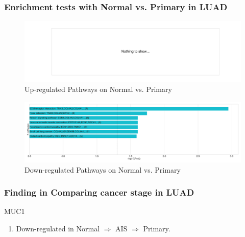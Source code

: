 \documentclass{beamer}
\begin{document}
    \begin{frame}
        \frametitle{Enrichment tests with Normal vs. Primary in LUAD}

        \begin{figure}
            \includegraphics[width=0.8 \linewidth]{figures/DEG/Enrichment/STAR.FPKM.ADC.Normal-Primary.Up.KEGG.pdf}
            \caption{Up-regulated Pathways on Normal vs. Primary}
        \end{figure}

        \begin{figure}
            \includegraphics[width=0.8 \linewidth]{figures/DEG/Enrichment/STAR.FPKM.ADC.Normal-Primary.Down.KEGG.pdf}
            \caption{Down-regulated Pathways on Normal vs. Primary}
        \end{figure}
    \end{frame}

    \begin{frame}[allowframebreaks]
        \frametitle{Finding in Comparing cancer stage in LUAD}

        \begin{block}{MUC1}
            \begin{enumerate}
                \item Down-regulated in Normal $\Rightarrow$ AIS $\Rightarrow$ Primary.
            \end{enumerate}
        \end{block}
    \end{frame}
\end{document}

